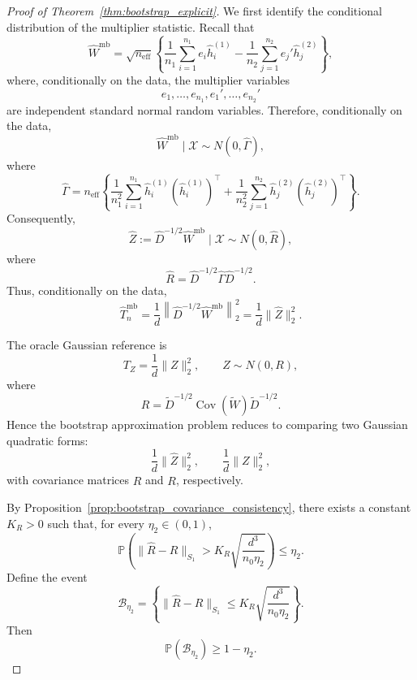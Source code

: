 \documentclass[
  12pt]{article}
\theoremstyle{plain}
\theoremstyle{definition}
\theoremstyle{remark}
\begin{document}
\begin{proof}[Proof of Theorem~\ref{thm:bootstrap_explicit}]
We first identify the conditional distribution of the multiplier statistic.
Recall that
\[
\widehat W^{\mathrm{mb}}
=
\sqrt{n_{\mathrm{eff}}}
\left\{
\frac1{n_1}\sum_{i=1}^{n_1}e_i\widehat h_i^{(1)}
-
\frac1{n_2}\sum_{j=1}^{n_2}e_j'\widehat h_j^{(2)}
\right\},
\]
where, conditionally on the data, the multiplier variables
\[
e_1,\ldots,e_{n_1},e_1',\ldots,e_{n_2}'
\]
are independent standard normal random variables. Therefore,
conditionally on the data,
\[
\widehat W^{\mathrm{mb}}\mid\mathcal X
\sim
N(0,\widehat\Gamma),
\]
where
\[
\widehat\Gamma
=
n_{\mathrm{eff}}
\left\{
\frac1{n_1^2}\sum_{i=1}^{n_1}
\widehat h_i^{(1)}(\widehat h_i^{(1)})^\top
+
\frac1{n_2^2}\sum_{j=1}^{n_2}
\widehat h_j^{(2)}(\widehat h_j^{(2)})^\top
\right\}.
\]
Consequently,
\[
\widehat Z
:=
\widehat D^{-1/2}\widehat W^{\mathrm{mb}}
\mid\mathcal X
\sim
N(0,\widehat R),
\]
where
\[
\widehat R
=
\widehat D^{-1/2}\widehat\Gamma\widehat D^{-1/2}.
\]
Thus, conditionally on the data,
\[
\widehat T_n^{\mathrm{mb}}
=
\frac1d
\left\|
\widehat D^{-1/2}\widehat W^{\mathrm{mb}}
\right\|_2^2
=
\frac1d\|\widehat Z\|_2^2.
\]

The oracle Gaussian reference is
\[
T_Z
=
\frac1d\|Z\|_2^2,
\qquad
Z\sim N(0,R),
\]
where
\[
R=
\widetilde D^{-1/2}
\operatorname{Cov}(\widetilde W)
\widetilde D^{-1/2}.
\]
Hence the bootstrap approximation problem reduces to comparing two Gaussian
quadratic forms:
\[
\frac1d\|\widehat Z\|_2^2,
\qquad
\frac1d\|Z\|_2^2,
\]
with covariance matrices \(\widehat R\) and \(R\), respectively.

By Proposition~\ref{prop:bootstrap_covariance_consistency}, there exists a
constant \(K_R>0\) such that, for every \(\eta_2\in(0,1)\),
\[
\mathbb P
\left(
\|\widehat R-R\|_{S_1}
>
K_R\sqrt{\frac{d^3}{n_0\eta_2}}
\right)
\le
\eta_2.
\]
Define the event
\[
\mathcal B_{\eta_2}
=
\left\{
\|\widehat R-R\|_{S_1}
\le
K_R\sqrt{\frac{d^3}{n_0\eta_2}}
\right\}.
\]
Then
\[
\mathbb P(\mathcal B_{\eta_2})\ge 1-\eta_2.
\]


\end{proof}
\end{document}
